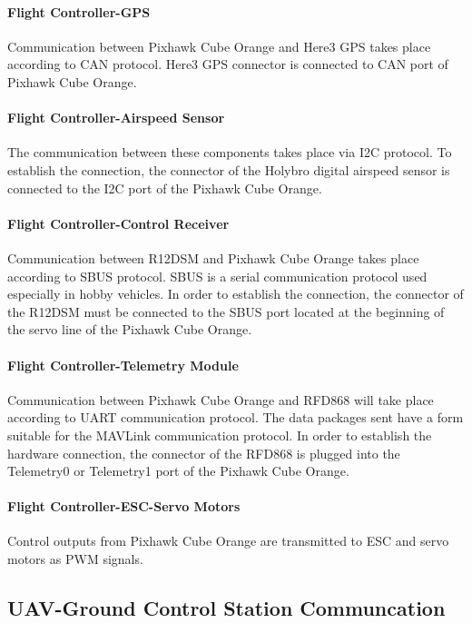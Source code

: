 \documentclass[12pt]{article}
\begin{document}
\paragraph*{Flight Controller-GPS} Communication between Pixhawk Cube Orange and Here3 GPS takes place according to CAN protocol. Here3 GPS connector is connected to CAN port of Pixhawk Cube Orange.

\paragraph*{Flight Controller-Airspeed Sensor} The communication between these components takes place via I2C protocol. To establish the connection, the connector of the Holybro digital airspeed sensor is connected to the I2C port of the Pixhawk Cube Orange.

\paragraph*{Flight Controller-Control Receiver}Communication between R12DSM and Pixhawk Cube Orange takes place according to SBUS protocol. SBUS is a serial communication protocol used especially in hobby vehicles. In order to establish the connection, the connector of the R12DSM must be connected to the SBUS port located at the beginning of the servo line of the Pixhawk Cube Orange.

\paragraph*{Flight Controller-Telemetry Module} Communication between Pixhawk Cube Orange and RFD868 will take place according to UART communication protocol. The data packages sent have a form suitable for the MAVLink communication protocol. In order to establish the hardware connection, the connector of the RFD868 is plugged into the Telemetry0 or Telemetry1 port of the Pixhawk Cube Orange. 

\paragraph*{Flight Controller-ESC-Servo Motors} Control outputs from Pixhawk Cube Orange are transmitted to ESC and servo motors as PWM signals.

\subsection{UAV-Ground Control Station Communcation}
\end{document}
